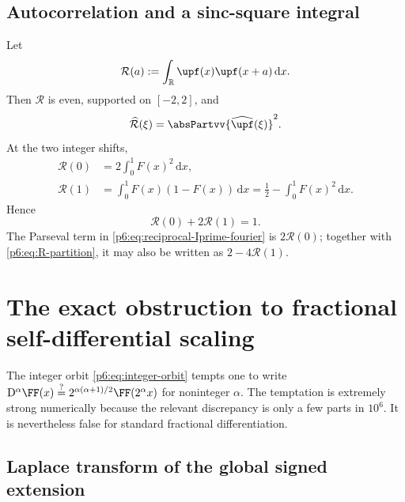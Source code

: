 \documentclass[11pt,oneside]{article}
\theoremstyle{definition}
\theoremstyle{remark}
\newcommand{\R}{\mathbb R}
\newcommand{\dd}{\,\mathrm d}
\newcommand{\1}{\mathbf 1}
\begin{document}
\subsection{Autocorrelation and a sinc-square integral}

Let
\begin{equation}
 \mathcal R(a):=\int_\R\upf(x)\upf(x+a)\dd x.             \label{p6:eq:autocorrelation}
\end{equation}
Then \(\mathcal R\) is even, supported on \([-2,2]\), and
\begin{equation}
 \widehat{\mathcal R}(\xi)=\absPartvv{\widehat{\upf}(\xi)}^2. \label{p6:eq:autocorrelation-Fourier}
\end{equation}
At the two integer shifts,
\begin{align}
 \mathcal R(0)&=2\int_0^1F(x)^2\dd x,                    \label{p6:eq:R0}\\
 \mathcal R(1)&=\int_0^1F(x)(1-F(x))\dd x
 =\frac12-\int_0^1F(x)^2\dd x.                           \label{p6:eq:R1}
\end{align}
Hence
\begin{equation}
 \boxed{\mathcal R(0)+2\mathcal R(1)=1.}                 \label{p6:eq:R-partition}
\end{equation}
The Parseval term in \eqref{p6:eq:reciprocal-Iprime-fourier} is
\(2\mathcal R(0)\); together with \eqref{p6:eq:R-partition}, it may also be written as
\(2-4\mathcal R(1)\).

\section{The exact obstruction to fractional self-differential scaling}
\label{p6:sec:fractional-obstruction}

The integer orbit \eqref{p6:eq:integer-orbit} tempts one to write
\(
 \mathrm D^\alpha\FF(x)
 \stackrel?=2^{\alpha(\alpha+1)/2}\FF(2^\alpha x)
\)
for noninteger \(\alpha\).  The temptation is extremely strong numerically because the
relevant discrepancy is only a few parts in \(10^6\).  It is nevertheless false for
standard fractional differentiation.

\subsection{Laplace transform of the global signed extension}
\end{document}
